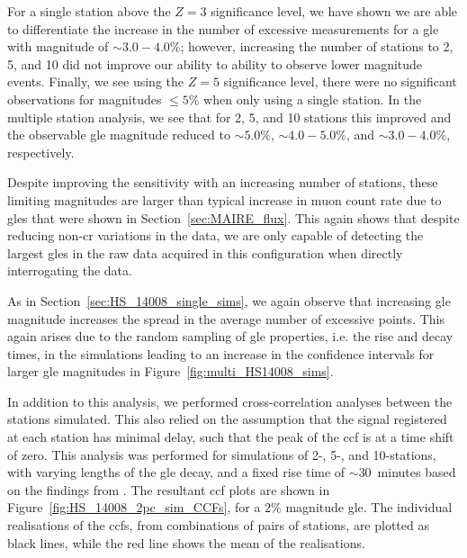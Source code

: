 For a single station above the $Z=3$ significance level, we have shown we are able to differentiate the increase in the number of excessive measurements for a \gls{gle} with magnitude of $\sim 3.0 - 4.0 \%$; however, increasing the number of stations to 2, 5, and 10 did not improve our ability to ability to observe lower magnitude events. Finally, we see using the $Z=5$ significance level, there were no significant observations for magnitudes $\leq 5\%$ when only using a single station. In the multiple station analysis, we see that for 2, 5, and 10 stations this improved and the observable \gls{gle} magnitude reduced to $\sim 5.0 \%$, $\sim 4.0 - 5.0 \%$, and $\sim 3.0 - 4.0 \%$, respectively. 

Despite improving the sensitivity with an increasing number of stations, these limiting magnitudes are larger than typical increase in muon count rate due to \glspl{gle} that were shown in Section~\ref{sec:MAIRE_flux}. This again shows that despite reducing non-\gls{cr} variations in the data, we are only capable of detecting the largest \glspl{gle} in the raw data acquired in this configuration when directly interrogating the data.

As in Section~\ref{sec:HS_14008_single_sims}, we again observe that increasing \gls{gle} magnitude increases the spread in the average number of excessive points. This again arises due to the random sampling of \gls{gle} properties, i.e. the rise and decay times, in the simulations leading to an increase in the confidence intervals for larger \gls{gle} magnitudes in Figure~\ref{fig:multi_HS14008_sims}.


In addition to this analysis, we performed cross-correlation analyses between the stations simulated. This also relied on the assumption that the signal registered at each station has minimal delay, such that the peak of the \gls{ccf} is at a time shift of zero. This analysis was performed for simulations of 2-, 5-, and 10-stations, with varying lengths of the \gls{gle} decay, and a fixed rise time of $\sim 30$~minutes based on the findings from \citet{strauss_pulse_2017}. The resultant \gls{ccf} plots are shown in Figure~\ref{fig:HS_14008_2pc_sim_CCFs}, for a $2 \%$ magnitude \gls{gle}. The individual realisations of the \glspl{ccf}, from combinations of pairs of stations, are plotted as black lines, while the red line shows the mean of the realisations.



